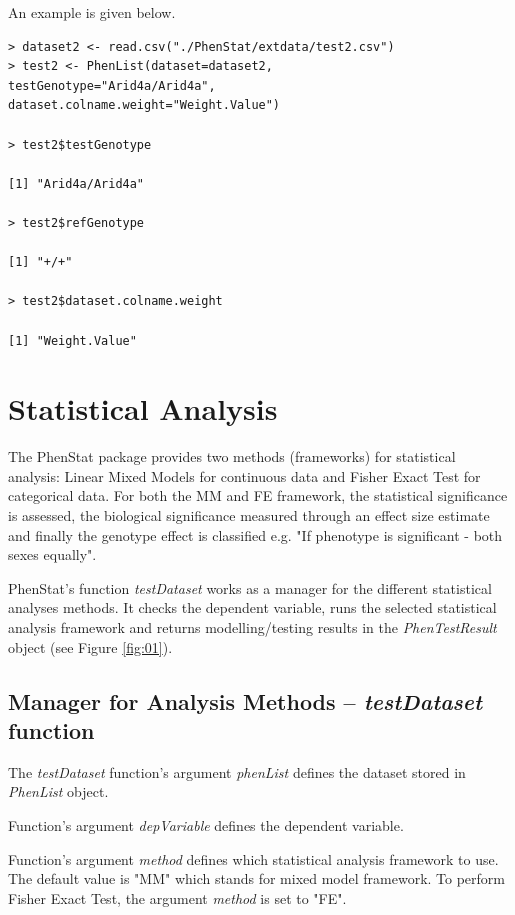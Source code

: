 \documentclass[12pt,a4paper]{article}
\begin{document}
An example is given below.
\begingroup
    \fontsize{8pt}{12pt}\selectfont
\begin{verbatim}
> dataset2 <- read.csv("./PhenStat/extdata/test2.csv")
> test2 <- PhenList(dataset=dataset2,
testGenotype="Arid4a/Arid4a",
dataset.colname.weight="Weight.Value")

> test2$testGenotype

[1] "Arid4a/Arid4a"

> test2$refGenotype

[1] "+/+"

> test2$dataset.colname.weight

[1] "Weight.Value"
\end{verbatim}
\endgroup

\section{Statistical Analysis}
The PhenStat package provides two methods (frameworks) for statistical analysis: Linear Mixed Models for continuous data and Fisher Exact Test for categorical data. For both the MM and FE framework, 
the statistical significance is assessed, the biological significance measured through an effect size estimate and finally the genotype effect is classified e.g. "If phenotype is significant - both sexes equally".  


PhenStat's function \textit{testDataset} works as a manager for the different statistical analyses methods. It checks the dependent variable, runs the selected statistical analysis framework and
 returns modelling\slash testing results in the \textit{PhenTestResult} object (see Figure \ref{fig:01}). 

\subsection{Manager for Analysis Methods -- \textit{testDataset} function}
The \textit{testDataset} function's argument \textit{phenList} defines the dataset stored in \textit{PhenList} object.

Function's argument \textit{depVariable} defines the dependent variable.

Function's argument \textit{method} defines which statistical analysis framework to use. 
The default value is "MM" which stands for mixed model framework. To perform Fisher Exact Test, the argument \textit{method} is set to "FE". 
\end{document}
